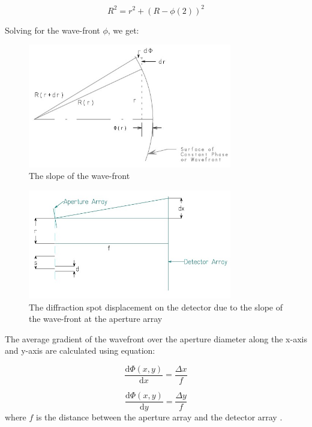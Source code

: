 \documentclass{article}
\begin{document}
\begin{equation}
R^2=r^2+(R-\phi(2))^2
\end{equation}

Solving for the wave-front $\phi$, we get:



\begin{figure}[H]
    \centering
    \includegraphics[width=3.5in]{figures/slope2.jpg}
    \caption{The slope of the wave-front}
    \label{fig:slope2}
\end{figure}

\begin{figure}[H]
    \centering
    \includegraphics[width=3.5in]{figures/slope3.jpg}
    \caption{The diffraction spot displacement on the detector due to the slope of the wave-front at the aperture array}
    \label{fig:slope3}
\end{figure}

The average gradient of the wavefront over the aperture diameter along the x-axis and y-axis are calculated using equation:

\begin{equation}
\frac{\mathrm{d} \Phi(x,y)}{\mathrm{d} x}=\frac{\Delta x}{f}
\end{equation}

\begin{equation}
\frac{\mathrm{d} \Phi(x,y)}{\mathrm{d} y}=\frac{\Delta y}{f}
\end{equation}
where $f$ is the distance between the aperture array and the detector array \cite{spiricon04}.
\end{document}
